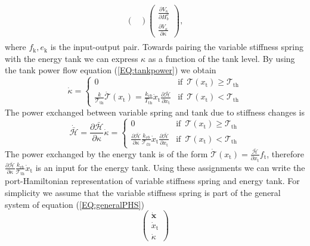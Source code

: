 \documentclass[a4paper,twoside, openright,12pt]{report}
\newcommand{\f}[1]{\boldsymbol{#1}}
\newcommand{\g}[1]{\text{#1}}
\begin{document}
{\begin{eqnarray}
\begin{aligned}
\begin{pmatrix}
\end{pmatrix}
\begin{pmatrix}
\frac{\partial V_{\kappa}}{\partial H_b^v} \\ \frac{\partial V_{\kappa}}{\partial \kappa}
\end{pmatrix},
\end{aligned}
\end{eqnarray}
where $f_\g{k},e_\g{k}$ is the input-output pair. Towards pairing the variable stiffness spring with the energy tank we can express $\kappa$ as a function of the tank level. By using the tank power flow equation (\ref{EQ:tankpower}) we obtain
\begin{equation}
\dot{\kappa} = \begin{cases}
0 & \text{if } \, \mathcal{T}(x_\g{t})\geq \mathcal{T}_{\g{th}} \\
\frac{k}{\mathcal{T}_{\g{th}}}\dot{\mathcal{T}}(x_\g{t}) = \frac{k_{vb}}{T_{\g{th}}} \dot{x}_\g{t} \frac{\partial \bar{\mathcal{H}}}{\partial x_\g{t}} & \text{if }  \, \mathcal{T}(x_\g{t}) < \mathcal{T}_{\g{th}}
\end{cases}
\end{equation}
The power exchanged between variable spring and tank due to stiffness changes is
\begin{equation}
\dot{\bar{\mathcal{H}}} = \frac{\partial \bar{\mathcal{H}}}{\partial \kappa}\dot{\kappa} =
\begin{cases}
0 & \text{if } \, \mathcal{T}(x_\g{t})\geq \mathcal{T}_{\g{th}} \\
\frac{\partial \bar{\mathcal{H}}}{\partial \kappa}\frac{k_{vb}}{\mathcal{T}_{th}} \dot{x}_\g{t} \frac{\partial \bar{\mathcal{H}}}{\partial x_\g{t}} & \text{if }  \, \mathcal{T}(x_\g{t}) < \mathcal{T}_{\g{th}}
\end{cases}
\end{equation}
The power exchanged by the energy tank is of the form $\dot{\mathcal{T}}(x_\g{t}) = \frac{\bar{\mathcal{H}}}{\partial x_\g{t}}f_\g{t}$, therefore $\frac{\partial \bar{\mathcal{H}}}{\partial \kappa}\frac{k_{vb}}{\mathcal{T}_{\g{th}}} \dot{x}_\g{t}$ is an input for the energy tank. Using these assignments we can write the port-Hamiltonian representation of variable stiffness spring and energy tank. For simplicity we assume that the variable stiffness spring is part of the general system of equation (\ref{EQ:generalPHS})
\begin{equation}
\begin{pmatrix}
\dot{\f{x}} \\ \dot{x}_\g{t} \\ \dot{\kappa}

\end{pmatrix}
\end{equation}}
\end{document}
